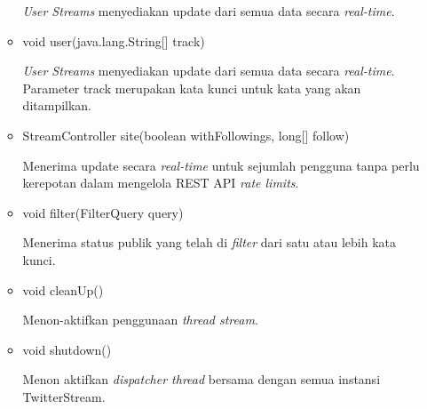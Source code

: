 \begin{itemize}
\begin{itemize}
			\textit{User Streams} menyediakan update dari semua data secara \textit{real-time}.
			\item void user(java.lang.String[] track)
			
			\textit{User Streams} menyediakan update dari semua data secara \textit{real-time}. Parameter track merupakan kata kunci untuk kata yang akan ditampilkan.
			\item StreamController site(boolean withFollowings, long[] follow)
			
			Menerima update secara \textit{real-time} untuk sejumlah pengguna tanpa perlu kerepotan dalam mengelola REST API \textit{rate limits}.
			\item void filter(FilterQuery query)
			
			Menerima status publik yang telah di \textit{filter} dari satu atau lebih kata kunci.
			\item void cleanUp()
			
			Menon-aktifkan penggunaan \textit{thread stream}.
			\item void shutdown()
			
			Menon aktifkan \textit{dispatcher thread} bersama dengan semua instansi TwitterStream.
		\end{itemize}
	\end{itemize}
	
